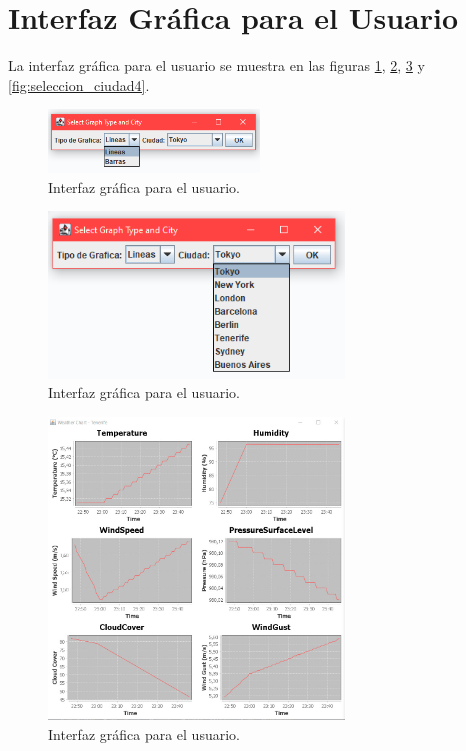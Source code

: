 \documentclass{article}
\begin{document}
\section{Interfaz Gráfica para el Usuario}
La interfaz gráfica para el usuario se muestra en las figuras \ref{fig:seleccion_ciudad}, \ref{fig:seleccion_ciudad2}, \ref{fig:seleccion_ciudad3} y \ref{fig:seleccion_ciudad4}.

\begin{figure}[H]
    \centering
    \includegraphics[width=0.5\textwidth]{images/image5.png}
    \caption{Interfaz gráfica para el usuario.}
    \label{fig:seleccion_ciudad}
\end{figure}

\begin{figure}[H]
    \centering
    \includegraphics[width=0.7\textwidth]{images/image9.png}
    \caption{ Interfaz gráfica para el usuario.}
    \label{fig:seleccion_ciudad2}
\end{figure}

\begin{figure}[H]
  \centering
  \includegraphics[width=0.7\textwidth]{images/image4.png}
  \caption{Interfaz gráfica para el usuario.}
  \label{fig:seleccion_ciudad3}
\end{figure}
\end{document}

